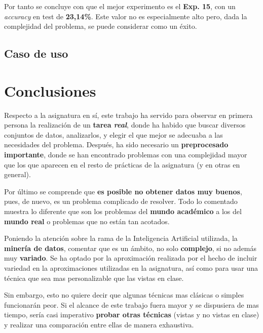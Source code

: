 \documentclass[12pt,a4paper, xcolor=table]{article}
\begin{document}
Por tanto se concluye con que el mejor experimento es el \textbf{Exp. 15}, con un \textit{accuracy} en test de \textbf{23,14\%}. Este valor no es especialmente alto pero, dada la complejidad del problema, se puede considerar como un éxito.





\subsection{Caso de uso}







\section{Conclusiones}
Respecto a la asignatura en sí, este trabajo ha servido para observar en primera persona la realización de un \textbf{tarea \textit{real}}, donde ha habido que buscar diversos conjuntos de datos, analizarlos, y elegir el que mejor se adecuaba a las necesidades del problema. Después, ha sido necesario un \textbf{preprocesado importante}, donde se han encontrado problemas con una complejidad mayor que los que aparecen en el resto de prácticas de la asignatura (y en otras en general).

\vspace{3mm}

Por último se comprende que \textbf{es posible no obtener datos muy buenos}, pues, de nuevo, es un problema complicado de resolver.  Todo lo comentado muestra lo diferente que son los problemas del \textbf{mundo académico} a los del \textbf{mundo real} o problemas que no están tan acotados.

\vspace{3mm}

Poniendo la atención sobre la rama de la Inteligencia Artificial utilizada, la \textbf{minería de datos}, comentar que es un ámbito, no solo \textbf{complejo}, si no además muy \textbf{variado}. Se ha optado por la aproximación realizada por el hecho de incluir variedad en la aproximaciones utilizadas en la asignatura, así como para usar una técnica que sea mas personalizable que las vistas en clase.

\vspace{3mm}

Sin embargo, esto no quiere decir que algunas técnicas mas clásicas o simples funcionarán peor. Si el alcance de este trabajo fuera mayor y se dispusiera de mas tiempo, sería casi imperativo \textbf{probar otras técnicas} (vistas y no vistas en clase) y realizar una comparación entre ellas de manera exhaustiva.

\clearpage



\end{document}
